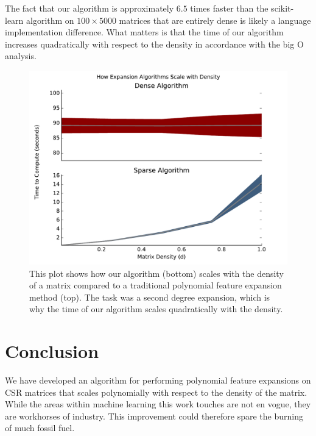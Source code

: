 \documentclass{article} %
\begin{document}
The fact that our algorithm is approximately $6.5$ times faster than the scikit-learn algorithm on $100 \times 5000$ matrices that are entirely dense is likely a language implementation difference.
What matters is that the time of our algorithm increases quadratically with respect to the density in accordance with the big O analysis.

\begin{figure}[H]
    \centering
    \includegraphics[scale=0.6]{density_vs_time}
    \caption{This plot shows how our algorithm (bottom) scales with the density of a matrix compared to a traditional polynomial feature expansion method (top).
             The task was a second degree expansion, which is why the time of our algorithm scales quadratically with the density.}
    \label{fig:benchmark}
\end{figure}

\section{Conclusion}
We have developed an algorithm for performing polynomial feature expansions on CSR matrices that scales polynomially with respect to the density of the matrix.
While the areas within machine learning this work touches are not en vogue, they are workhorses of industry.
This improvement could therefore spare the burning of much fossil fuel.



\end{document}
